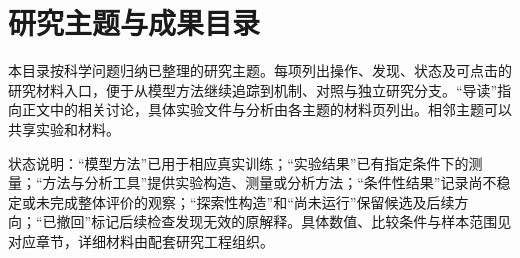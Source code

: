 \FloatBarrier\clearpage
\section{研究主题与成果目录}
\label{app:catalog}

本目录按科学问题归纳已整理的研究主题。每项列出操作、发现、状态及可点击的研究材料入口，便于从模型方法继续追踪到机制、对照与独立研究分支。“导读”指向正文中的相关讨论，具体实验文件与分析由各主题的材料页列出。相邻主题可以共享实验和材料。

状态说明：“模型方法”已用于相应真实训练；“实验结果”已有指定条件下的测量；“方法与分析工具”提供实验构造、测量或分析方法；“条件性结果”记录尚不稳定或未完成整体评价的观察；“探索性构造”和“尚未运行”保留候选及后续方向；“已撤回”标记后续检查发现无效的原解释。具体数值、比较条件与样本范围见对应章节，详细材料由配套研究工程组织。


